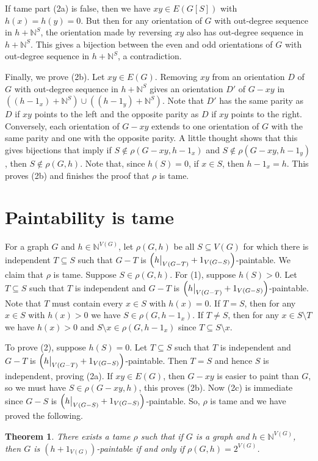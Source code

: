\documentclass[12pt]{article}
\theoremstyle{plain}
\newtheorem{thm}{Theorem}[section]
\theoremstyle{definition}
\theoremstyle{remark}
\newcommand{\IN}{\mathbb{N}}
\newcommand{\parens}[1]{\left( #1 \right)}
\newcommand\restr[2]{{%
  \left.\kern-\nulldelimiterspace %
  #1 %
  \vphantom{\big|} %
  \right|_{#2} %
  }}
\begin{document}
If tame part (2a) is false, then we have $xy \in E(G[S])$ with $h(x) = h(y) = 0$.  But then for any orientation of $G$ with out-degree sequence in $h + \IN^S$, the orientation made by reversing $xy$ also has out-degree sequence in $h + \IN^S$.  This gives a bijection between the even and odd orientations of $G$ with out-degree sequence in $h + \IN^S$, a contradiction.

Finally, we prove (2b).  Let $xy \in E(G)$.  Removing $xy$ from an orientation $D$ of $G$ with out-degree sequence in $h + \IN^S$ gives an orientation $D'$ of $G-xy$ in $((h - 1_x) + \IN^S) \cup ((h - 1_y) + \IN^S)$.  Note that $D'$ has the same parity as $D$ if $xy$ points to the left and the opposite parity as $D$ if $xy$ points to the right.  Conversely, each orientation of $G-xy$ extends to one orientation of $G$ with the same parity and one with the opposite parity.  A little thought shows that this gives bijections that imply if $S \not \in \rho(G-xy, h - 1_x)$ and $S \not \in \rho(G-xy, h - 1_y)$, then $S \not \in \rho(G, h)$.  Note that, since $h(S)=0$, if $x \in S$, then $h - 1_x = h$.  This proves (2b) and finishes the proof that $\rho$ is tame.

\section{Paintability is tame}
For a graph $G$ and $h \in \IN^{V(G)}$, let $\rho(G,h)$ be all $S \subseteq V(G)$ for which there is independent $T \subseteq S$ such that $G-T$ is $\parens{\restr{h}{V(G-T)} + 1_{V(G-S)}}$-paintable.  We claim that $\rho$ is tame.  Suppose $S \in \rho(G,h)$. For (1), suppose $h(S)>0$.  Let $T \subseteq S$ such that $T$ is independent and $G-T$ is $\parens{\restr{h}{V(G-T)} + 1_{V(G-S)}}$-paintable.  Note that $T$ must contain every $x \in S$ with $h(x)=0$.  If $T=S$, then for any $x \in S$ with $h(x)>0$ we have $S \in \rho(G, h - 1_x)$.  If $T \ne S$, then for any $x \in S \setminus T$ we have $h(x) > 0$ and $S\setminus x \in \rho(G, h - 1_x)$ since $T \subseteq S\setminus x$.

To prove (2), suppose $h(S) = 0$.  Let $T \subseteq S$ such that $T$ is independent and $G-T$ is $\parens{\restr{h}{V(G-T)} + 1_{V(G-S)}}$-paintable.  Then $T=S$ and hence $S$ is independent, proving (2a).  If $xy \in E(G)$, then $G-xy$ is easier to paint than $G$, so we must have $S \in \rho(G-xy, h)$, this proves (2b).  Now (2c) is immediate since $G-S$ is $\parens{\restr{h}{V(G-S)} + 1_{V(G-S)}}$-paintable.  So, $\rho$ is tame and we have proved the following.

\begin{thm}
	There exists a tame $\rho$ such that if $G$ is a graph and $h \in \IN^{V(G)}$, then $G$ is $(h + 1_{V(G)})$-paintable if and only if $\rho(G, h) = 2^{V(G)}$.
\end{thm}



\end{document}
